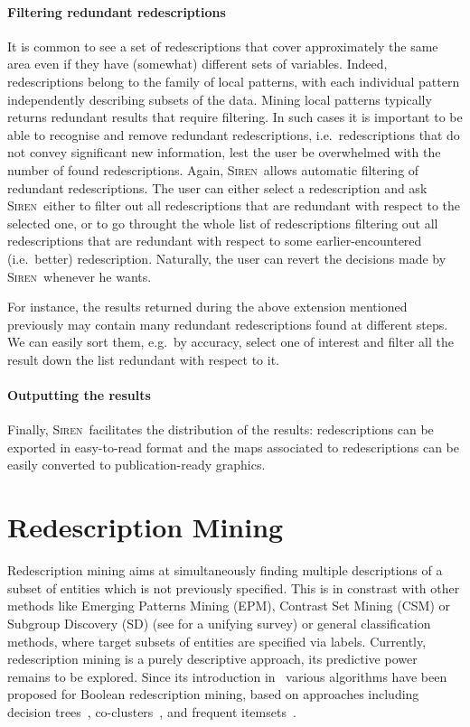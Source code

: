 \documentclass{sig-alternate}
\newcommand{\prg}[1]{\paragraph{#1}}
\newcommand{\Siren}{\textsc{Siren}}
\begin{document}
\prg{Filtering redundant redescriptions}
\label{sec:filt-redund-redescr}
It is common to see a set of redescriptions that cover approximately
the same area even if they have (somewhat) different sets of
variables.  Indeed, redescriptions belong to the family of local
patterns, with each individual pattern independently describing
subsets of the data. Mining local patterns typically returns redundant
results that require filtering.  In such cases it is important to be
able to recognise and remove redundant redescriptions, i.e.\
redescriptions that do not convey significant new information, lest
the user be overwhelmed with the number of found
redescriptions. Again, \Siren\ allows automatic filtering of redundant
redescriptions. The user can either select a redescription and ask
\Siren\ either to filter out all redescriptions that are redundant
with respect to the selected one, or to go throught the whole list of
redescriptions filtering out all redescriptions that are redundant
with respect to some earlier-encountered (i.e.\ better)
redescription. Naturally, the user can revert the decisions made by
\Siren\ whenever he wants.

For instance, the results returned during the above extension
mentioned previously may contain many redundant redescriptions found
at different steps. We can easily sort them, e.g.\ by accuracy, select
one of interest and filter all the result down the list redundant with respect to it.


\prg{Outputting the results}
\label{sec:outputting-results}
Finally, \Siren\ facilitates the distribution of the results:
redescriptions can be exported in easy-to-read format and the
maps associated to redescriptions can be easily converted to
publication-ready graphics. 

\section{Redescription Mining}
Redescription mining aims at simultaneously finding multiple
descriptions of a subset of entities which is not previously
specified.  This is in constrast with other methods like Emerging
Patterns Mining (EPM), Contrast Set Mining (CSM) or Subgroup Discovery
(SD) (see \cite{kralj09supervised} for a unifying survey) or general
classification methods, where target subsets of entities are specified
via labels.  Currently, redescription mining is a purely descriptive
approach, its predictive power remains to be explored.  Since its
introduction in~\cite{ramakrishnan04turning} various algorithms have
been proposed for Boolean redescription mining, based on approaches
including decision
trees~\cite{ramakrishnan04turning,kumar07redescription},
co-clusters~\cite{parida05redescription}, and frequent
itemsets~\cite{gallo08finding}.
\end{document}
